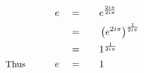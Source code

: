 \begin{alignat*}{5}
&\,&e\quad&=\quad&&e^\frac{2i\pi}{2i\pi}\\
&\,&\,&=&&\left(e^{2i\pi}\right)^\frac{1}{2i\pi}\\
&\,&\,&=&&1^\frac{1}{2i\pi}\\
&\small\text{Thus}\normalsize\qquad&e\quad&=&&1\\
\end{alignat*}
